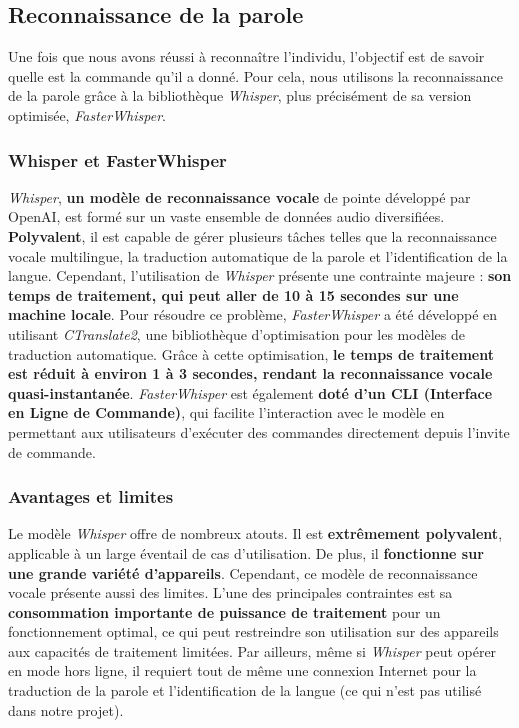 \subsection{Reconnaissance de la parole}
\label{subsec:Reconnaissance_parole}

Une fois que nous avons réussi à reconnaître l'individu, l'objectif est de
savoir quelle est la commande qu'il a donné. Pour cela, nous utilisons la
reconnaissance de la parole grâce à la bibliothèque \textit{Whisper}, plus
précisément de sa version optimisée, \textit{FasterWhisper}.

\subsubsection*{Whisper et FasterWhisper}

\textit{Whisper}, \textbf{un modèle de reconnaissance vocale} de pointe développé par OpenAI, est formé sur un vaste ensemble de données audio diversifiées. \textbf{Polyvalent}, il est
capable de gérer plusieurs tâches telles que la reconnaissance vocale multilingue, la traduction automatique de la parole et l'identification de la langue.
Cependant, l'utilisation de \textit{Whisper} présente une contrainte majeure : \textbf{son temps de traitement, qui peut aller de 10 à 15 secondes sur une machine locale}.
Pour résoudre ce problème, \textit{FasterWhisper} a été développé en utilisant
\textit{CTranslate2}, une bibliothèque d'optimisation pour les modèles de
traduction automatique. Grâce à cette optimisation, \textbf{le temps de
	traitement est réduit à environ 1 à 3 secondes, rendant la reconnaissance vocale quasi-instantanée}.
\textit{FasterWhisper} est également \textbf{doté d'un CLI (Interface en Ligne de Commande)}, qui facilite l'interaction avec le modèle en permettant aux utilisateurs d'exécuter des commandes directement depuis
l'invite de commande.

\subsubsection*{Avantages et limites}

Le modèle \textit{Whisper} offre de nombreux atouts. Il est \textbf{extrêmement
	polyvalent}, applicable à un large éventail de cas d'utilisation. De plus, il
\textbf{fonctionne sur une grande variété d'appareils}. Cependant, ce modèle de
reconnaissance vocale présente aussi des limites. L'une des principales
contraintes est sa \textbf{consommation importante de puissance de traitement}
pour un fonctionnement optimal, ce qui peut restreindre son utilisation sur des
appareils aux capacités de traitement limitées. Par ailleurs, même si
\textit{Whisper} peut opérer en mode hors ligne, il requiert tout de même une
connexion Internet pour la traduction de la parole et l'identification de la
langue (ce qui n'est pas utilisé dans notre projet).

